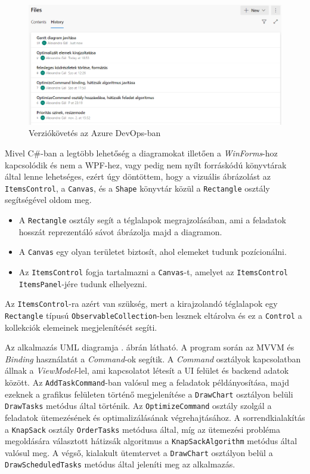 \begin{figure}[h]
	\centering
	\includegraphics[scale=0.5]{images/azureHistory.png}
	\caption{Verziókövetés az Azure DevOps-ban}
	\label{fig:azureHistory}
\end{figure}


Mivel C\#-ban a legtöbb lehetőség a diagramokat illetően a \textit{WinForms}-hoz kapcsolódik és nem a WPF-hez, vagy pedig nem nyílt forráskódú könyvtárak által lenne lehetséges, ezért úgy döntöttem, hogy a vizuális ábrázolást az \texttt{ItemsControl}, a \texttt{Canvas}, és a \texttt{Shape} könyvtár közül a \texttt{Rectangle} osztály segítségével oldom meg.
\begin{itemize}
	\item A \texttt{Rectangle} osztály segít a téglalapok megrajzolásában, ami a feladatok hosszát reprezentáló sávot ábrázolja majd a diagramon.
	\item A \texttt{Canvas} egy olyan területet biztosít, ahol elemeket tudunk pozícionálni.
	\item Az \texttt{ItemsControl} fogja tartalmazni a \texttt{Canvas}-t, amelyet az \texttt{ItemsControl} \\ \texttt{ItemsPanel}-jére tudunk elhelyezni.
\end{itemize}
Az \texttt{ItemsControl}-ra azért van szükség, mert a kirajzolandó téglalapok egy \texttt{Rectangle} típusú \texttt{ObservableCollection}-ben lesznek eltárolva és ez a \texttt{Control} a kollekciók elemeinek megjelenítését segíti.


Az alkalmazás UML diagramja . ábrán látható. A program során az MVVM és \textit{Binding} használatát a \textit{Command}-ok segítik. A \textit{Command} osztályok kapcsolatban állnak a \textit{ViewModel}-lel, ami kapcsolatot létesít a UI felület és backend adatok között. Az \texttt{AddTaskCommand}-ban valósul meg a feladatok példányosítása, majd ezeknek a grafikus felületen történő megjelenítése a \texttt{DrawChart} osztályon belüli \texttt{DrawTasks} metódus által történik. Az \texttt{OptimizeCommand} osztály szolgál a feladatok ütemezésének és optimalizálásának végrehajtásához. A sorrendkialakítás a \texttt{KnapSack} osztály \texttt{OrderTasks} metódusa által, míg az ütemezési probléma megoldására választott hátizsák algoritmus a \texttt{KnapSackAlgorithm} metódus által valósul meg. A végső, kialakult ütemtervet a \texttt{DrawChart} osztályon belül a \texttt{DrawScheduledTasks} metódus által jeleníti meg az alkalmazás.

